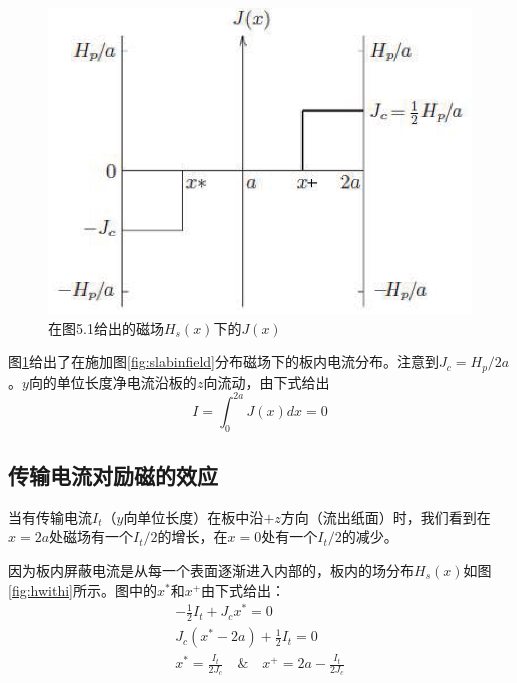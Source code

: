 \begin{figure}[htbp]
  \centering
 \includegraphics[scale=0.8]{chpt5/figs/fig5.4.eps}
  \caption{在图5.1给出的磁场$H_s(x)$下的$J(x)$}\label{fig:jtoh}
\end{figure}
图\ref{fig:jtoh}给出了在施加图\ref{fig:slabinfield}分布磁场下的板内电流分布。注意到$J_c=H_p /2a$。$y$向的单位长度净电流沿板的$z$向流动，由下式给出
\begin{equation}
  I=\int_{0}^{2a} J(x)dx=0
\end{equation}

\subsection{传输电流对励磁的效应}
当有传输电流$I_t$（$y$向单位长度）在板中沿$+z$方向（流出纸面）时，我们看到在$x=2a$处磁场有一个$I_t/2$的增长，在$x=0$处有一个$I_t/2$的减少。

因为板内屏蔽电流是从每一个表面逐渐进入内部的，板内的场分布$H_s(x)$如图\ref{fig:hwithi}所示。图中的$x^*$和$x^+$由下式给出：
\begin{subequations}
	\begin{align}
  -\frac{1}{2}I_t + J_c x^* = 0 \\ 
J_c(x^*-2a)+\frac{1}{2}I_t = 0 \\ 
x^*=\frac{I_t}{2J_c}\quad \& \quad x^+ = 2a-\frac{I_t}{2J_c}
	\end{align}
\end{subequations}


